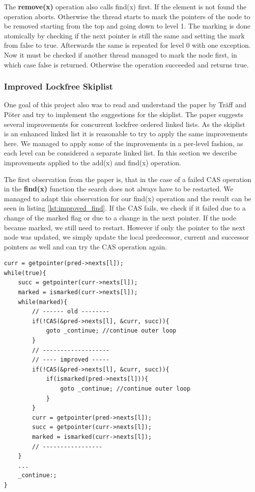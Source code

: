 \documentclass{article}
\begin{document}
\noindent The \textbf{remove(x)} operation also calls find(x) first. If the element is not found the operation aborts. Otherwise the thread starts to mark the pointers of the node to be removed starting from the top and going down to level 1. The marking is done atomically by checking if the next pointer is still the same and setting the mark from false to true. Afterwards the same is repeated for level 0 with one exception. Now it must be checked if another thread managed to mark the node first, in which case false is returned. Otherwise the operation succeeded and returns true.

\subsubsection{Improved Lockfree Skiplist}
One goal of this project also was to read and understand the paper \cite{improvements} by Träff and Pöter and try to implement the suggestions for the skiplist. The paper suggests several improvements for concurrent lockfree ordered linked lists. As the skiplist is an enhanced linked list it is reasonable to try to apply the same improvements here. We managed to apply some of the improvements in a per-level fashion, as each level can be considered a separate linked list. In this section we describe improvements applied to the add(x) and find(x) operation.\par \medskip

\noindent The first observation from the paper is, that in the case of a failed CAS operation in the \textbf{find(x)} function the search does not always have to be restarted. We managed to adapt this observation for our find(x) operation and the result can be seen in listing \ref{lst:improved_find}. If the CAS fails, we check if it failed due to a change of the marked flag or due to a change in the next pointer. If the node became marked, we still need to restart. However if only the pointer to the next node was updated, we simply update the local predecessor, current and successor pointers as well and can try the CAS operation again. 

\begin{lstlisting}[float,floatplacement=H,style=CStyle, caption=Improved find(x) operation, label=lst:improved_find]
curr = getpointer(pred->nexts[l]);
while(true){
    succ = getpointer(curr->nexts[l]);
    marked = ismarked(curr->nexts[l]);
    while(marked){
        // ------ old --------
        if(!CAS(&pred->nexts[l], &curr, succ)){
            goto _continue; //continue outer loop
        }
        // -------------------
        // ---- improved -----
        if(!CAS(&pred->nexts[l], &curr, succ)){
            if(ismarked(pred->nexts[l])){
                goto _continue; //continue outer loop
            }
        }
        curr = getpointer(pred->nexts[l]);
        succ = getpointer(curr->nexts[l]);
        marked = ismarked(curr->nexts[l]);
        // -----------------
    }
    ...
    _continue:;
}
\end{lstlisting}
\end{document}
